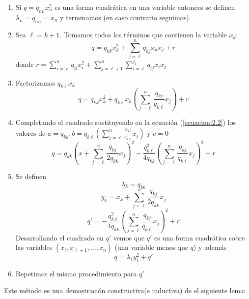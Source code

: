 \begin{enumerate}
\item Si $q = q_{nn}x_{n}^{2}$ es una forma cuadrática en una variable entonces se definen $\lambda_{n} = q_{nn} = x_{n}$ y terminamos (en caso contrario seguimos).
\item Sea $\ell = k + 1$. Tomamos todos los términos que contienen la variable $x_{k}$:
\begin{equation*}
q = q_{kk}x_{k}^{2} + \sum_{j=\ell}^{n}q_{kj}x_{k}x_{j} + r
\end{equation*}
donde $r = \sum_{i=\ell}^{n}q_{ii}x_{i}^{2} + \sum_{j=\ell+1}^{n}\sum_{i=\ell}^{j_1} q_{ij}x_{i}x_{j}$
\item Factorizamos $q_{k\ell}x_{k}$
 \begin{equation*}
q = q_{kk}x_{k}^{2} + q_{k\ell}x_{k}\left(\sum_{j=\ell}^{n}\frac{q_{kj}}{q_{k\ell}}x_{j}\right) + r
\end{equation*}
\item Completando el cuadrado sustituyendo en la ecuación (\ref{ecuacion:2.2}) los valores de $a = q_{kk}, b= q_{k\ell}\left(\sum_{j=\ell}^{n}\frac{q_{kj}}{q_{k\ell}}x_{j}\right)$ y $c=0$
\begin{equation*}
q = q_{kk}\left(x + \sum_{j=\ell}^{n}\frac{q_{kj}}{2q_{kk}}x_{j}\right)^{2} - \frac{q_{k\ell}^{2}}{4q_{kk}}\left(\sum_{j=\ell}^{n}\frac{q_{kj}}{q_{k\ell}}x_{j}\right)^{2} + r
\end{equation*}
\item Se definen
\begin{equation*}
\lambda_{k} = q_{kk}
\end{equation*}
\begin{equation*}
y_{k} = x_{k} + \sum_{j=\ell}^{n}\frac{q_{kj}}{2q_{kk}}x_{j}
\end{equation*}
\begin{equation*}
q' = -\frac{q_{k\ell}^{2}}{4q_{kk}}\left(\sum_{j=\ell}^{n}\frac{q_{kj}}{q_{k\ell}}x_{j}\right)^{2} + r
\end{equation*}
Desarrollando el cuadrado en $q'$ vemos que $q'$ es una forma cuadrática sobre las variables $\left(x_{\ell},x_{\ell+1},\ldots,x_{n}\right)$ (una variable menos que $q$) y además 
\begin{equation*}
q = \lambda_{1}y_{1}^{2} + q'
\end{equation*}
\item Repetimos el mismo procedimiento para $q'$
\end{enumerate}

Este método es una demostración constructiva(e inductiva) de el siguiente lema:

